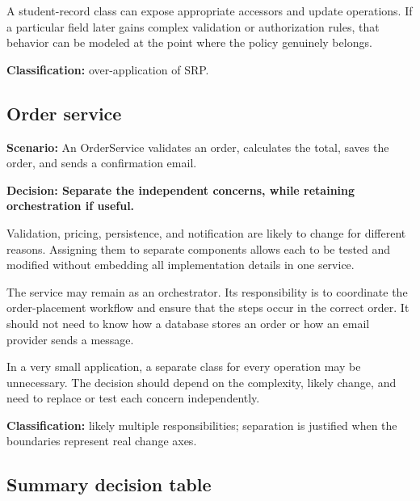 \documentclass[12pt,a4paper]{article}
\begin{document}
A student-record class can expose appropriate accessors and update operations. If a particular field later gains complex validation or authorization rules, that behavior can be modeled at the point where the policy genuinely belongs.

\textbf{Classification:} over-application of SRP.

\subsection{Order service}

\textbf{Scenario:} An OrderService validates an order, calculates the total, saves the order, and sends a confirmation email.

\textbf{Decision: Separate the independent concerns, while retaining orchestration if useful.}

Validation, pricing, persistence, and notification are likely to change for different reasons. Assigning them to separate components allows each to be tested and modified without embedding all implementation details in one service.

The service may remain as an orchestrator. Its responsibility is to coordinate the order-placement workflow and ensure that the steps occur in the correct order. It should not need to know how a database stores an order or how an email provider sends a message.

In a very small application, a separate class for every operation may be unnecessary. The decision should depend on the complexity, likely change, and need to replace or test each concern independently.

\textbf{Classification:} likely multiple responsibilities; separation is justified when the boundaries represent real change axes.

\subsection{Summary decision table}
\end{document}
